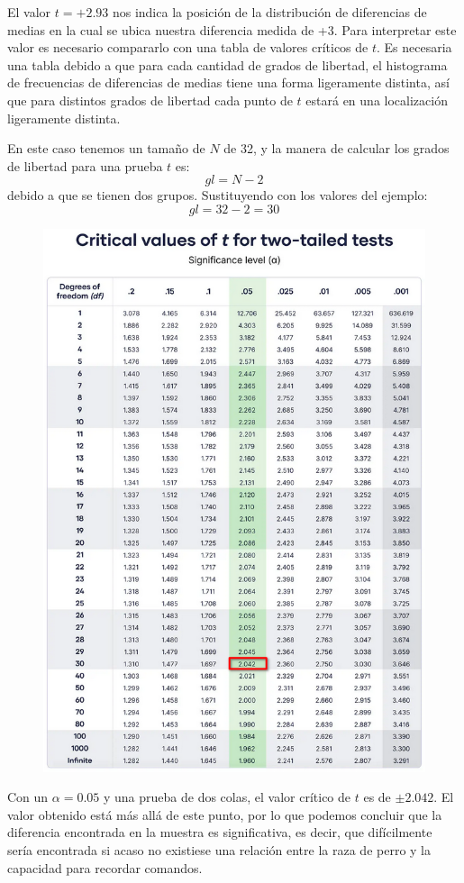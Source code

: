 \documentclass[a4paper,12pt]{article}
\begin{document}
El valor $t = +2{.}93$ nos indica la posición de la distribución de diferencias de medias en la cual se ubica nuestra diferencia medida de +3. Para interpretar este valor es necesario compararlo con una tabla de valores críticos de $t$. Es necesaria una tabla debido a que para cada cantidad de grados de libertad, el histograma de frecuencias de diferencias de medias tiene una forma ligeramente distinta, así que para distintos grados de libertad cada punto de $t$ estará en una localización ligeramente distinta.

En este caso tenemos un tamaño de $N$ de 32, y la manera de calcular los grados de libertad para una prueba $t$ es:
\[
gl = N - 2
\]
debido a que se tienen dos grupos. Sustituyendo con los valores del ejemplo:
\[
gl = 32 -2 = 30
\]
\begin{figure}[!ht]
  \begin{center}
    \includegraphics[scale=0.5]{tablaT.png}
  \end{center}
\end{figure}

Con un $\alpha = 0{.}05$ y una prueba de dos colas, el valor crítico de $t$ es de $\pm 2{.}042$. El valor obtenido está más allá de este punto, por lo que podemos concluir que la diferencia encontrada en la muestra es significativa, es decir, que difícilmente sería encontrada si acaso no existiese una relación entre la raza de perro y la capacidad para recordar comandos.
\end{document}
